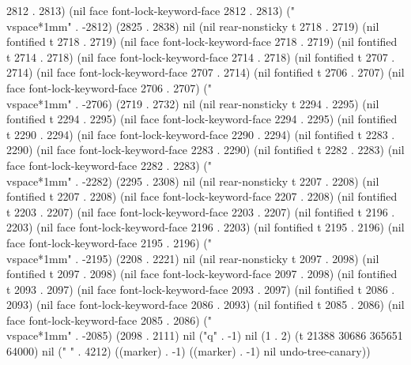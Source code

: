 2812 . 2813) (nil face font-lock-keyword-face 2812 . 2813) ("\\vspace*{1mm}" . -2812) (2825 . 2838) nil (nil rear-nonsticky t 2718 . 2719) (nil fontified t 2718 . 2719) (nil face font-lock-keyword-face 2718 . 2719) (nil fontified t 2714 . 2718) (nil face font-lock-keyword-face 2714 . 2718) (nil fontified t 2707 . 2714) (nil face font-lock-keyword-face 2707 . 2714) (nil fontified t 2706 . 2707) (nil face font-lock-keyword-face 2706 . 2707) ("\\vspace*{1mm}" . -2706) (2719 . 2732) nil (nil rear-nonsticky t 2294 . 2295) (nil fontified t 2294 . 2295) (nil face font-lock-keyword-face 2294 . 2295) (nil fontified t 2290 . 2294) (nil face font-lock-keyword-face 2290 . 2294) (nil fontified t 2283 . 2290) (nil face font-lock-keyword-face 2283 . 2290) (nil fontified t 2282 . 2283) (nil face font-lock-keyword-face 2282 . 2283) ("\\vspace*{1mm}" . -2282) (2295 . 2308) nil (nil rear-nonsticky t 2207 . 2208) (nil fontified t 2207 . 2208) (nil face font-lock-keyword-face 2207 . 2208) (nil fontified t 2203 . 2207) (nil face font-lock-keyword-face 2203 . 2207) (nil fontified t 2196 . 2203) (nil face font-lock-keyword-face 2196 . 2203) (nil fontified t 2195 . 2196) (nil face font-lock-keyword-face 2195 . 2196) ("\\vspace*{1mm}" . -2195) (2208 . 2221) nil (nil rear-nonsticky t 2097 . 2098) (nil fontified t 2097 . 2098) (nil face font-lock-keyword-face 2097 . 2098) (nil fontified t 2093 . 2097) (nil face font-lock-keyword-face 2093 . 2097) (nil fontified t 2086 . 2093) (nil face font-lock-keyword-face 2086 . 2093) (nil fontified t 2085 . 2086) (nil face font-lock-keyword-face 2085 . 2086) ("\\vspace*{1mm}" . -2085) (2098 . 2111) nil ("q" . -1) nil (1 . 2) (t 21388 30686 365651 64000) nil ("
" . 4212) ((marker) . -1) ((marker) . -1) nil undo-tree-canary))
